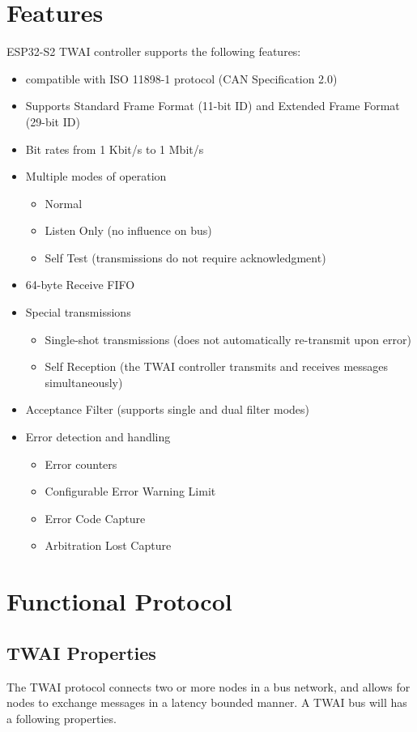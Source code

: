 \documentclass[main\_\_EN.tex]{subfiles}
\begin{document}
\section{Features}
ESP32-S2 TWAI controller supports the following features:
\begin{itemize}
    \item compatible with ISO 11898-1 protocol (CAN Specification 2.0)
    \item Supports Standard Frame Format (11-bit ID) and Extended Frame Format (29-bit ID)
    \item Bit rates from 1 Kbit/s to 1 Mbit/s
    \item Multiple modes of operation
    \begin{itemize}
        \item Normal
        \item Listen Only (no influence on bus)
        \item Self Test (transmissions do not require acknowledgment)
    \end{itemize}
    \item 64-byte Receive FIFO
    \item Special transmissions
    \begin{itemize}
        \item Single-shot transmissions (does not automatically re-transmit upon error)
        \item Self Reception (the TWAI controller transmits and receives messages simultaneously)
    \end{itemize}
    \item Acceptance Filter (supports single and dual filter modes)
    \item Error detection and handling
    \begin{itemize}
        \item Error counters
        \item Configurable Error Warning Limit
        \item Error Code Capture
        \item Arbitration Lost Capture
    \end{itemize}
\end{itemize}

\section{Functional Protocol}
\label{subsec:protocol-description}
\subsection{TWAI Properties}
The TWAI protocol connects two or more nodes in a bus network, and allows for nodes to exchange messages in a latency bounded manner. A TWAI bus will has a following properties.
\end{document}
